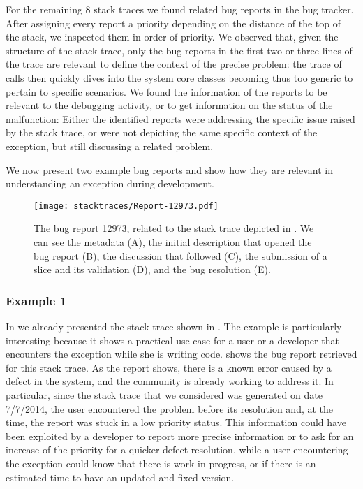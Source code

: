 For the remaining 8 stack traces we found related bug reports in the bug tracker.
After assigning every report a priority depending on the distance of the top of the stack, we inspected them in order of priority.
We observed that, given the structure of the stack trace, only the bug reports in the first two or three lines of the trace are relevant to define the context of the precise problem: the trace of calls then quickly dives into the system core classes becoming thus too generic to pertain to specific scenarios.
We found the information of the reports to be relevant to the debugging activity, or to get information on the status of the malfunction: Either the identified reports were addressing the specific issue raised by the stack trace, or were not depicting the same specific context of the exception, but still discussing a related problem.

We now present two example bug reports and show how they are relevant in understanding an exception during development.


\clearpage

\begin{figure}[!ht]
\centering
  \texttt{[image: stacktraces/Report-12973.pdf]}
  \caption[The bug report 12973]{The bug report 12973, related to the stack trace depicted in .
We can see the metadata (A), the initial description that opened the bug report (B), the discussion that followed (C), the submission of a slice and its validation (D), and the bug resolution (E).}
  \label{fig:report}
\end{figure}

\subsubsection{Example 1}

In  we already presented the stack trace shown in .
The example is particularly interesting because it shows a practical use case for a user or a developer that encounters the exception while she is writing code.
 shows the bug report retrieved for this stack trace.
As the report shows, there is a known error caused by a defect in the system, and the community is already working to address it.
In particular, since the stack trace that we considered was generated on date 7/7/2014, the user encountered the problem before its resolution and, at the time, the report was stuck in a low priority status.
This information could have been exploited by a developer to report more precise information or to ask for an increase of the priority for a quicker defect resolution, while a user encountering the exception could know that there is work in progress, or if there is an estimated time to have an updated and fixed version.

